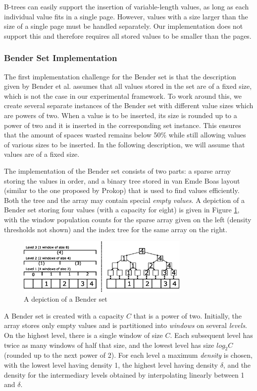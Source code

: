 \documentclass{acm_proc_article-sp}
\begin{document}
B-trees can easily support the insertion of variable-length values, as long
as each individual value fits in a single page. However, values with
a size larger than the size of a single page must be handled separately.
Our implementation does not support this and therefore requires all
stored values to be smaller than the pages.

\subsubsection{Bender Set Implementation}
\label{sect-bender-set}
The first implementation challenge for the Bender set is that the description
given by Bender et al. assumes that all values stored in the set are of a
fixed size, which is not the case in our experimental framework. To work
around this, we create several separate instances of the Bender set with
different value sizes which are powers of two. When a value is to be inserted,
its size is rounded up to a power of two and it is inserted in the
corresponding set instance. This ensures that the amount of spaces wasted
remains below 50\% while still allowing values of various sizes to be inserted.
In the following description, we will assume that values are of a fixed size.

The implementation of the Bender set consists of two parts: a sparse array
storing the values in order, and a binary tree stored in van Emde Boas
layout (similar to the one proposed by Prokop) that is used to find values
efficiently.
Both the tree and the array may contain special \emph{empty values}.
A depiction of a Bender set storing four values (with a capacity for eight) is
given in Figure \ref{fig-bender-set}, with the window population counts for
the sparse array given on the left (density thresholds not shown) and the index tree for the same array on the right.

\begin{figure}
\centering
\includegraphics[width=83mm]{bender-set}
\caption{A depiction of a Bender set}
\label{fig-bender-set}
\end{figure}

A Bender set is created with a capacity $C$ that is a power of two.
Initially, the array stores only empty values and is partitioned into
\emph{windows} on several \emph{levels}.
On the highest level, there is a single window of size $C$. Each subsequent level
has twice as many windows of half that size, and the lowest level has size
$log_2 C$ (rounded up to the next power of 2).
For each level a maximum \emph{density} is chosen, with the lowest level having
density 1, the highest level having density $\delta$, and the density for
the intermediary levels obtained by interpolating linearly between 1 and
$\delta$.
\end{document}

